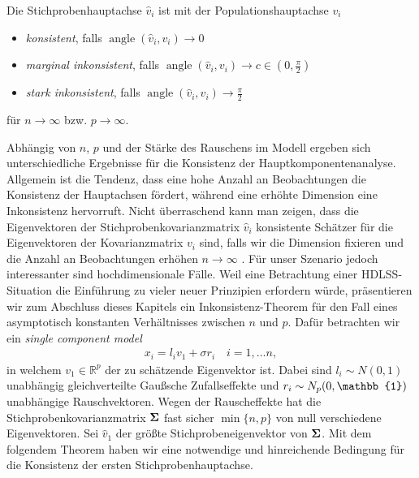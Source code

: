 \begin{defn}
Die Stichprobenhauptachse $\widehat{v}_i$ ist mit der Populationshauptachse $v_i$
\begin{itemize}
\item \textit{konsistent}, falls $\operatorname{angle}(\widehat{v}_i, v_i) \longrightarrow 0$
\item \textit{marginal inkonsistent}, falls $\operatorname{angle}(\widehat{v}_i, v_i) \longrightarrow c \in (0,\frac{\pi}{2})$
\item \textit{stark inkonsistent}, falls $\operatorname{angle}(\widehat{v}_i, v_i) \longrightarrow \frac{\pi}{2}$
\end{itemize} 
für $n \to \infty$ bzw. $p \rightarrow \infty$. 
\end{defn}

Abhängig von $n$, $p$ und der Stärke des Rauschens im Modell ergeben sich unterschiedliche Ergebnisse für die Konsistenz der Hauptkomponentenanalyse. Allgemein ist die Tendenz, dass eine hohe Anzahl an Beobachtungen die Konsistenz der Hauptachsen fördert, während eine erhöhte Dimension eine Inkonsistenz hervorruft. Nicht überraschend kann man zeigen, dass die Eigenvektoren der Stichprobenkovarianzmatrix $\widehat{v}_i$ konsistente Schätzer für die Eigenvektoren der Kovarianzmatrix $v_i$ sind, falls wir die Dimension fixieren und die Anzahl an Beobachtungen erhöhen $n \rightarrow \infty$ \cite{anderson}. Für unser Szenario jedoch interessanter sind hochdimensionale Fälle. Weil eine Betrachtung einer HDLSS-Situation die Einführung zu vieler neuer Prinzipien erfordern würde, präsentieren wir zum Abschluss dieses Kapitels ein Inkonsistenz-Theorem für den Fall eines asymptotisch konstanten Verhältnisses zwischen $n$ und $p$. Dafür betrachten wir ein \textit{single component model} \cite{johnstone}
\begin{align}
\label{single_component_model}
x_i = l_i v_1 + \sigma r_i \quad i = 1, \ldots n,
\end{align}
in welchem $v_1 \in \mathbb{R}^p$ der zu schätzende Eigenvektor ist. Dabei sind $l_i \sim N(0,1)$ unabhängig gleichverteilte Gaußsche Zufallseffekte und $r_i \sim N_p(0, \mat{\mathbb{1}})$ unabhängige Rauschvektoren. Wegen der Rauscheffekte hat die Stichprobenkovarianzmatrix $\mathbf{\Sigma}$ fast sicher $\min\{n,p\}$ von null verschiedene Eigenvektoren. Sei $\widehat{v}_1$ der größte Stichprobeneigenvektor von $\mathbf{\Sigma}$. Mit dem folgendem Theorem haben wir eine notwendige und hinreichende Bedingung für die Konsistenz der ersten Stichprobenhauptachse.

